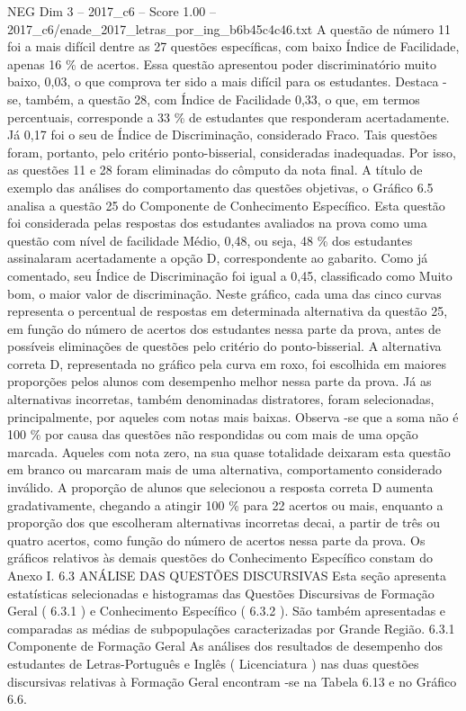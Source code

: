 \begin{textsample}{NEG Dim 3 – 2017\_c6 – Score 1.00 – 2017\_c6/enade\_2017\_letras\_por\_ing\_b6b45c4c46.txt}
A questão de número 11 foi a mais difícil dentre as 27 questões específicas, com baixo Índice de Facilidade, apenas 16 \% de acertos.
Essa questão apresentou poder discriminatório muito baixo, 0,03, o que comprova ter sido a mais difícil para os estudantes.
Destaca -se, também, a questão 28, com Índice de Facilidade 0,33, o que, em termos percentuais, corresponde a 33 \% de estudantes que responderam acertadamente.
Já 0,17 foi o seu de Índice de Discriminação, considerado Fraco.
Tais questões foram, portanto, pelo critério ponto-bisserial, consideradas inadequadas.
Por isso, as questões 11 e 28 foram eliminadas do cômputo da nota final.
A título de exemplo das análises do comportamento das questões objetivas, o Gráfico 6.5 analisa a questão 25 do Componente de Conhecimento Específico.
Esta questão foi considerada pelas respostas dos estudantes avaliados na prova como uma questão com nível de facilidade Médio, 0,48, ou seja, 48 \% dos estudantes assinalaram acertadamente a opção D, correspondente ao gabarito.
Como já comentado, seu Índice de Discriminação foi igual a 0,45, classificado como Muito bom, o maior valor de discriminação.
Neste gráfico, cada uma das cinco curvas representa o percentual de respostas em determinada alternativa da questão 25, em função do número de acertos dos estudantes nessa parte da prova, antes de possíveis eliminações de questões pelo critério do ponto-bisserial.
A alternativa correta D, representada no gráfico pela curva em roxo, foi escolhida em maiores proporções pelos alunos com desempenho melhor nessa parte da prova.
Já as alternativas incorretas, também denominadas distratores, foram selecionadas, principalmente, por aqueles com notas mais baixas.
Observa -se que a soma não é 100 \% por causa das questões não respondidas ou com mais de uma opção marcada.
Aqueles com nota zero, na sua quase totalidade deixaram esta questão em branco ou marcaram mais de uma alternativa, comportamento considerado inválido.
A proporção de alunos que selecionou a resposta correta D aumenta gradativamente, chegando a atingir 100 \% para 22 acertos ou mais, enquanto a proporção dos que escolheram alternativas incorretas decai, a partir de três ou quatro acertos, como função do número de acertos nessa parte da prova.
Os gráficos relativos às demais questões do Conhecimento Específico constam do Anexo I. 6.3 ANÁLISE DAS QUESTÕES DISCURSIVAS Esta seção apresenta estatísticas selecionadas e histogramas das Questões Discursivas de Formação Geral ( 6.3.1 ) e Conhecimento Específico ( 6.3.2 ).
São também apresentadas e comparadas as médias de subpopulações caracterizadas por Grande Região. 6.3.1 Componente de Formação Geral As análises dos resultados de desempenho dos estudantes de Letras-Português e Inglês ( Licenciatura ) nas duas questões discursivas relativas à Formação Geral encontram -se na Tabela 6.13 e no Gráfico 6.6.

\end{textsample}
